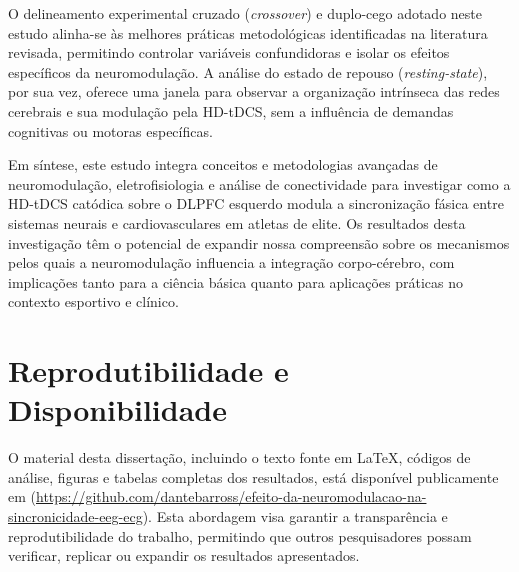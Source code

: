 O delineamento experimental cruzado (\textit{crossover}) e duplo-cego adotado neste estudo alinha-se às melhores práticas metodológicas identificadas na literatura revisada, permitindo controlar variáveis confundidoras e isolar os efeitos específicos da neuromodulação. A análise do estado de repouso (\textit{resting-state}), por sua vez, oferece uma janela para observar a organização intrínseca das redes cerebrais e sua modulação pela HD-tDCS, sem a influência de demandas cognitivas ou motoras específicas.

Em síntese, este estudo integra conceitos e metodologias avançadas de neuromodulação, eletrofisiologia e análise de conectividade para investigar como a HD-tDCS catódica sobre o DLPFC esquerdo modula a sincronização fásica entre sistemas neurais e cardiovasculares em atletas de elite. Os resultados desta investigação têm o potencial de expandir nossa compreensão sobre os mecanismos pelos quais a neuromodulação influencia a integração corpo-cérebro, com implicações tanto para a ciência básica quanto para aplicações práticas no contexto esportivo e clínico.

\section{Reprodutibilidade e Disponibilidade}
O material desta dissertação, incluindo o texto fonte em \LaTeX, códigos de análise, figuras e tabelas completas dos resultados, está disponível publicamente em  (\url{https://github.com/dantebarross/efeito-da-neuromodulacao-na-sincronicidade-eeg-ecg}). Esta abordagem visa garantir a transparência e reprodutibilidade do trabalho, permitindo que outros pesquisadores possam verificar, replicar ou expandir os resultados apresentados.